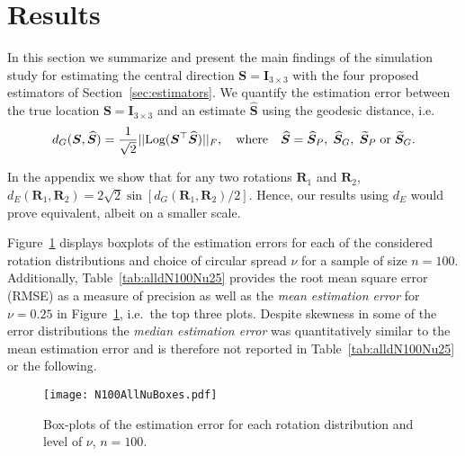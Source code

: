 \section{Results}\label{sec:results}

In this section we summarize and present the main findings of the simulation study for  estimating the central direction $\bm S = \bm I_{3\times 3}$ with the four proposed estimators of Section~\ref{sec:estimators}. We quantify the estimation error between the true location $\bm S = \bm I_{3\times 3}$ and an estimate $\widehat{\bm S}$ using the geodesic distance, i.e.  
\begin{equation}
d_G(\bm{S}, \widehat{\bm{S}}) =  \frac{1}{\sqrt{2}}||
\text{Log}(\bm{S}^\top\widehat{\bm{S}})||_F, \quad \mbox{where} \quad \widehat{\bm{S}} =  \widehat{\bm{S}}_P, \; \widehat{\bm{S}}_G,\;  \widetilde{\bm{S}}_P \; \mbox{or} \; \widetilde{\bm{S}}_G.
\end{equation}

\noindent In the appendix we show that for any two rotations $\bm R_1$ and $\bm R_2$, $d_E(\bm R_1,\bm R_2)=2\sqrt{2}\sin[d_G(\bm R_1,\bm R_2)/2]$.  Hence, our results using $d_E$ would prove equivalent, albeit on a smaller scale.   

Figure~\ref{fig:NuBoxes} displays boxplots of the estimation errors for each of the considered rotation distributions and choice of circular spread $\nu$ for a sample of size  $n=100$.  Additionally,  Table~\ref{tab:alldN100Nu25} provides the root mean square error (RMSE) as a measure of precision as well as the \textit{mean estimation error} for $\nu=0.25$ in Figure~\ref{fig:NuBoxes}, i.e.~the top three plots. Despite skewness in some of  the error distributions the \textit{median estimation error} was quantitatively similar to the mean estimation error and is therefore not reported in Table~\ref{tab:alldN100Nu25} or the following.
\begin{figure}[h!]
\centering
\texttt{[image: N100AllNuBoxes.pdf]}
\caption{Box-plots of the estimation error for each rotation distribution and level of $\nu$,  $n=100$.}
\label{fig:NuBoxes}
\end{figure}


